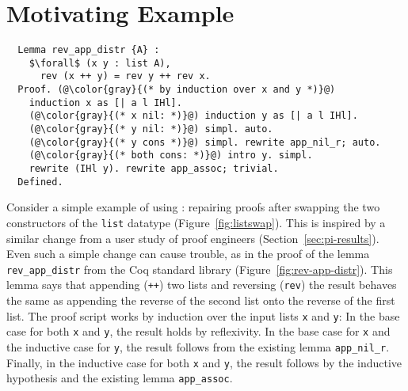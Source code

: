 \section{Motivating Example}
\label{sec:overview}

\begin{figure*}
\begin{minipage}{0.50\textwidth}
   
\end{minipage}
\hfill
\begin{minipage}{0.49\textwidth}
   
\end{minipage}
\caption{A change from the old version (left) to the new version (right) of \lstinline{list}.
Recall that \lstinline{list} is an inductive datatype that is either empty (the \lstinline{nil} constructor), or the result
of placing an element in front of another \lstinline{list} (the \lstinline{cons} constructor). The change swaps these
constructors ().}
\label{fig:listswap}
\end{figure*}

\begin{figure*}
\begin{lstlisting}
  Lemma rev_app_distr {A} :
    $\forall$ (x y : list A),
      rev (x ++ y) = rev y ++ rev x.
  Proof. (@\color{gray}{(* by induction over x and y *)}@)
    induction x as [| a l IHl].
    (@\color{gray}{(* x nil: *)}@) induction y as [| a l IHl].
    (@\color{gray}{(* y nil: *)}@) simpl. auto.
    (@\color{gray}{(* y cons *)}@) simpl. rewrite app_nil_r; auto.
    (@\color{gray}{(* both cons: *)}@) intro y. simpl.
    rewrite (IHl y). rewrite app_assoc; trivial.
  Defined.
\end{lstlisting}
\caption{The proof of the lemma \lstinline{rev_app_distr} from the Coq standard library. Comments mine for clarity.}
\label{fig:rev-app-distr}
\end{figure*}

Consider a simple example of using \toolnamec: repairing proofs after swapping the two constructors of the \lstinline{list} datatype (Figure~\ref{fig:listswap}).
This is inspired by a similar change from a user study of proof engineers (Section~\ref{sec:pi-results}).
Even such a simple change can cause trouble, as in the proof of the lemma \lstinline{rev_app_distr} from the
Coq standard library (Figure~\ref{fig:rev-app-distr}).
This lemma says that appending (\lstinline{++}) two lists and reversing (\lstinline{rev}) the result behaves the same as appending
the reverse of the second list onto the reverse of the first list.
The proof script works by induction over the input lists \lstinline{x} and \lstinline{y}:
In the base case for both \lstinline{x} and \lstinline{y}, the result holds by reflexivity.
In the base case for \lstinline{x} and the inductive case for \lstinline{y}, the result follows from the existing lemma \lstinline{app_nil_r}.
Finally, in the inductive case for both \lstinline{x} and \lstinline{y}, the result follows by the inductive hypothesis
and the existing lemma \lstinline{app_assoc}.

